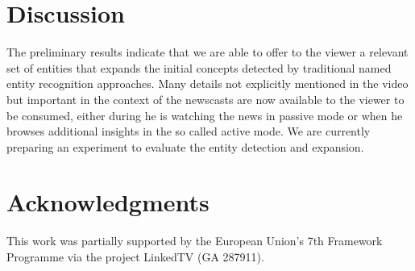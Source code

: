 \documentclass{llncs}
\begin{document}
\section{Discussion}
\label{sec:discussion}
The preliminary results indicate that we are able to offer to the viewer a relevant set of entities that expands the initial concepts detected by traditional named entity recognition approaches. Many details not explicitly mentioned in the video but important in the context of the newscasts are now available to the viewer to be consumed, either during he is watching the news in passive mode or when he browses additional insights in the so called active mode. We are currently preparing an experiment to evaluate the entity detection and expansion.




\section*{Acknowledgments}
This work was partially supported by the European Union's 7th Framework Programme via the project LinkedTV (GA 287911).



\end{document}
